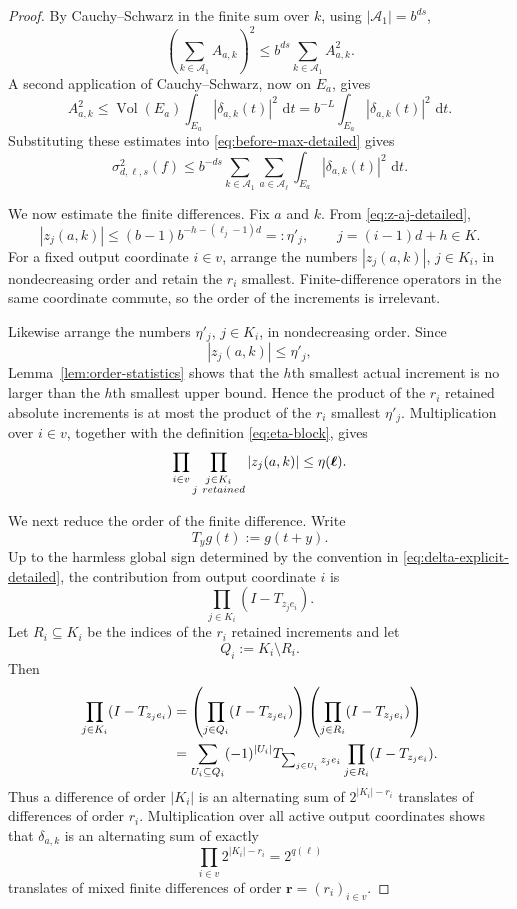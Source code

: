 \documentclass[11pt]{article}
\newcommand{\Vol}{\operatorname{Vol}}
\newcommand{\dd}{\,\mathrm d}
\begin{document}
\begin{proof}
By Cauchy--Schwarz in the finite sum over $k$, using
$|\mathcal A_1|=b^{ds}$,
\[
 \left(
   \sum_{k\in\mathcal A_1}A_{a,k}
 \right)^2
 \le
 b^{ds}\sum_{k\in\mathcal A_1}A_{a,k}^2.
\]
A second application of Cauchy--Schwarz, now on $E_a$, gives
\[
 A_{a,k}^2
 \le
 \Vol(E_a)
 \int_{E_a}|\delta_{a,k}(t)|^2\,\dd t
 =
 b^{-L}
 \int_{E_a}|\delta_{a,k}(t)|^2\,\dd t.
\]
Substituting these estimates into
\eqref{eq:before-max-detailed} gives
\begin{equation}\label{eq:block-L2-reduction-detailed}
 \sigma_{d,\boldsymbol\ell,s}^2(f)
 \le
 b^{-ds}
 \sum_{k\in\mathcal A_1}
 \sum_{a\in\mathcal A_{\boldsymbol\ell}}
 \int_{E_a}|\delta_{a,k}(t)|^2\,\dd t.
\end{equation}

We now estimate the finite differences.  Fix $a$ and $k$.
From \eqref{eq:z-aj-detailed},
\[
 |z_j(a,k)|
 \le
 (b-1)b^{-h-(\ell_j-1)d}
 =:\eta'_j,
 \qquad
 j=(i-1)d+h\in K.
\]
For a fixed output coordinate $i\in v$, arrange the numbers
$|z_j(a,k)|$, $j\in K_i$, in nondecreasing order and retain the
$r_i$ smallest.  Finite-difference operators in the same coordinate
commute, so the order of the increments is irrelevant.

Likewise arrange the numbers $\eta'_j$, $j\in K_i$, in
nondecreasing order.  Since
\[
 |z_j(a,k)|\le\eta'_j,
\]
Lemma~\ref{lem:order-statistics} shows that the $h$th smallest actual
increment is no larger than the $h$th smallest upper bound.  Hence
the product of the $r_i$ retained absolute increments is at most
the product of the $r_i$ smallest $\eta'_j$.  Multiplication over
$i\in v$, together with the definition \eqref{eq:eta-block}, gives
\begin{equation}\label{eq:retained-product-detailed}
 \prod_{i\in v}
 \prod_{\substack{j\in K_i\\ j\ {\rm retained}}}
 |z_j(a,k)|
 \le
 \eta(\boldsymbol\ell).
\end{equation}

We next reduce the order of the finite difference.  Write
\[
 T_yg(t):=g(t+y).
\]
Up to the harmless global sign determined by the convention in
\eqref{eq:delta-explicit-detailed}, the contribution from output
coordinate $i$ is
\[
 \prod_{j\in K_i}(I-T_{z_j e_i}).
\]
Let $R_i\subseteq K_i$ be the indices of the $r_i$ retained
increments and let
\[
 Q_i:=K_i\setminus R_i.
\]
Then
\begin{align}
 \prod_{j\in K_i}(I-T_{z_j e_i})
 &=
 \left(
   \prod_{j\in Q_i}(I-T_{z_j e_i})
 \right)
 \left(
   \prod_{j\in R_i}(I-T_{z_j e_i})
 \right)
 \notag\\
 &=
 \sum_{U_i\subseteq Q_i}
 (-1)^{|U_i|}
 T_{\sum_{j\in U_i}z_j e_i}
 \prod_{j\in R_i}(I-T_{z_j e_i}).
 \label{eq:difference-reduction-detailed}
\end{align}
Thus a difference of order $|K_i|$ is an alternating sum of
$2^{|K_i|-r_i}$ translates of differences of order $r_i$.
Multiplication over all active output coordinates shows that
$\delta_{a,k}$ is an alternating sum of exactly
\[
 \prod_{i\in v}2^{|K_i|-r_i}
 =
 2^{q(\boldsymbol\ell)}
\]
translates of mixed finite differences of order
$\boldsymbol r=(r_i)_{i\in v}$.


\end{proof}
\end{document}
